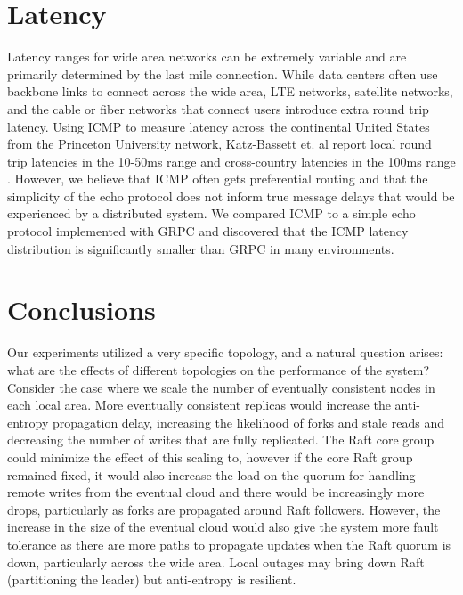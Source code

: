 \section{Latency}

Latency ranges for wide area networks can be extremely variable and are primarily determined by the last mile connection. While data centers often use backbone links to connect across the wide area, LTE networks, satellite networks, and the cable or fiber networks that connect users introduce extra round trip latency. Using ICMP to measure latency across the continental United States from the Princeton University network, Katz-Bassett et. al report local round trip latencies in the 10-50ms range and cross-country latencies in the 100ms range \cite{katz-bassett_towards_2006}. However, we believe that ICMP often gets preferential routing and that the simplicity of the echo protocol does not inform true message delays that would be experienced by a distributed system. We compared ICMP to a simple echo protocol implemented with GRPC and discovered that the ICMP latency distribution is significantly smaller than GRPC in many environments.

\section{Conclusions}

Our experiments utilized a very specific topology, and a natural question arises: what are the effects of different topologies on the performance of the system? Consider the case where we scale the number of eventually consistent nodes in each local area. More eventually consistent replicas would increase the anti-entropy propagation delay, increasing the likelihood of forks and stale reads and decreasing the number of writes that are fully replicated. The Raft core group could minimize the effect of this scaling to, however if the core Raft group remained fixed, it would also increase the load on the quorum for handling remote writes from the eventual cloud and there would be increasingly more drops, particularly as forks are propagated around Raft followers. However, the increase in the size of the eventual cloud would also give the system more fault tolerance as there are more paths to propagate updates when the Raft quorum is down, particularly across the wide area. Local outages may bring down Raft (partitioning the leader) but anti-entropy is resilient.

